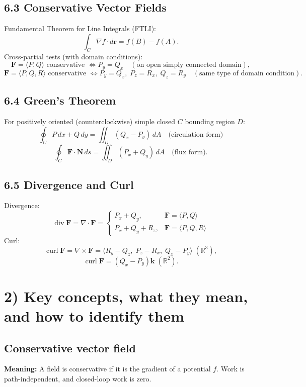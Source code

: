 \documentclass[12pt, twoside]{article}
\begin{document}
\subsection*{6.3 Conservative Vector Fields}
Fundamental Theorem for Line Integrals (FTLI):
\[
\int_C\nabla f\cdot d\mathbf{r}=f(B)-f(A).
\]
Cross-partial tests (with domain conditions):
\[
\mathbf{F}=\langle P,Q\rangle\text{ conservative }\Longleftrightarrow P_y=Q_x
\quad(\text{on open simply connected domain}),
\]
\[
\mathbf{F}=\langle P,Q,R\rangle\text{ conservative }\Longleftrightarrow
P_y=Q_x,\;P_z=R_x,\;Q_z=R_y
\quad(\text{same type of domain condition}).
\]

\subsection*{6.4 Green's Theorem}
For positively oriented (counterclockwise) simple closed $C$ bounding region $D$:
\[
\oint_C P\,dx+Q\,dy=\iint_D(Q_x-P_y)\,dA
\quad\text{(circulation form)}
\]
\[
\oint_C \mathbf{F}\cdot \mathbf{N}\,ds=\iint_D(P_x+Q_y)\,dA
\quad\text{(flux form)}.
\]

\subsection*{6.5 Divergence and Curl}
Divergence:
\[
\operatorname{div}\mathbf{F}=\nabla\cdot\mathbf{F}
=\begin{cases}
P_x+Q_y,&\mathbf{F}=\langle P,Q\rangle\\
P_x+Q_y+R_z,&\mathbf{F}=\langle P,Q,R\rangle
\end{cases}
\]
Curl:
\[
\operatorname{curl}\mathbf{F}=\nabla\times\mathbf{F}
=\langle R_y-Q_z,\;P_z-R_x,\;Q_x-P_y\rangle\;(\mathbb{R}^3),
\]
\[
\operatorname{curl}\mathbf{F}=(Q_x-P_y)\mathbf{k}\;(\mathbb{R}^2).
\]

\section*{2) Key concepts, what they mean, and how to identify them}

\subsection*{Conservative vector field}
\textbf{Meaning:} A field is conservative if it is the gradient of a potential $f$. Work is path-independent, and closed-loop work is zero.
\end{document}
